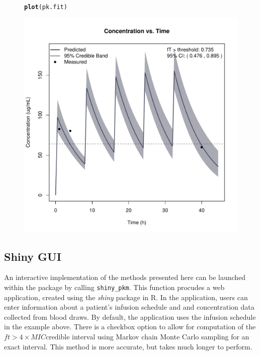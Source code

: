 \documentclass{article}\usepackage[]{graphicx}\usepackage[]{color}
\makeatletter
\def\maxwidth{ %
  \ifdim\Gin@nat@width>\linewidth
    \linewidth
  \else
    \Gin@nat@width
  \fi
}
\newcommand{\hlstd}[1]{\textcolor[rgb]{0.345,0.345,0.345}{#1}}%
\newcommand{\hlkwd}[1]{\textcolor[rgb]{0.737,0.353,0.396}{\textbf{#1}}}%
\newenvironment{kframe}{%
 \def\at@end@of@kframe{}%
 \ifinner\ifhmode%
  \def\at@end@of@kframe{\end{minipage}}%
  \begin{minipage}{\columnwidth}%
 \fi\fi%
 \def\FrameCommand##1{\hskip\@totalleftmargin \hskip-\fboxsep
 \colorbox{shadecolor}{##1}\hskip-\fboxsep
     \hskip-\linewidth \hskip-\@totalleftmargin \hskip\columnwidth}%
 \MakeFramed {\advance\hsize-\width
   \@totalleftmargin\z@ \linewidth\hsize
   \@setminipage}}%
 {\par\unskip\endMakeFramed%
 \at@end@of@kframe}
\newenvironment{knitrout}{}{} %
\newcommand{\mic}{$ft > 4 \times MIC$}
\makeatother
\begin{document}
\begin{figure}
\begin{knitrout}
\color{fgcolor}\begin{kframe}
\begin{alltt}
\hlkwd{plot}\hlstd{(pk.fit)}
\end{alltt}
\end{kframe}
\includegraphics[width=\maxwidth]{figure/unnamed-chunk-15-1} 

\end{knitrout}
\end{figure}



\newpage

\subsection{Shiny GUI}

An interactive implementation of the methods presented here can be launched within the package by calling \texttt{shiny_pkm}. This function procudes a web application, created using the {\it shiny} package in R. In the application, users can enter information about a patient's infusion schedule and and concentration data collected from blood draws. By default, the application uses the infusion schedule in the example above. There is a checkbox option to allow for computation of the \mic credible interval using Markov chain Monte Carlo sampling for an exact interval. This method is more accurate, but takes much longer to perform.
\end{document}
